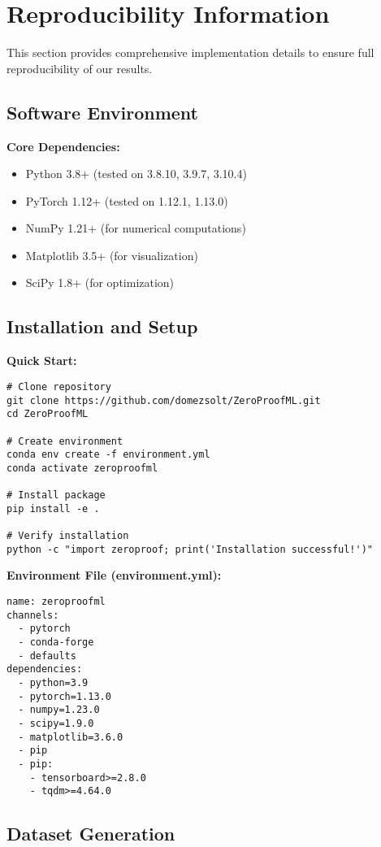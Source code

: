 \documentclass[twoside,11pt]{article}
\begin{document}
\section{Reproducibility Information}
\label{app:reproducibility}

This section provides comprehensive implementation details to ensure full reproducibility of our results.

\subsection{Software Environment}

\textbf{Core Dependencies:}
\begin{itemize}
\item Python 3.8+ (tested on 3.8.10, 3.9.7, 3.10.4)
\item PyTorch 1.12+ (tested on 1.12.1, 1.13.0)
\item NumPy 1.21+ (for numerical computations)
\item Matplotlib 3.5+ (for visualization)
\item SciPy 1.8+ (for optimization)
\end{itemize}

\subsection{Installation and Setup}

\textbf{Quick Start:}
\begin{verbatim}
# Clone repository
git clone https://github.com/domezsolt/ZeroProofML.git
cd ZeroProofML

# Create environment
conda env create -f environment.yml
conda activate zeroproofml

# Install package
pip install -e .

# Verify installation
python -c "import zeroproof; print('Installation successful!')"
\end{verbatim}

\textbf{Environment File (environment.yml):}
\begin{verbatim}
name: zeroproofml
channels:
  - pytorch
  - conda-forge
  - defaults
dependencies:
  - python=3.9
  - pytorch=1.13.0
  - numpy=1.23.0
  - scipy=1.9.0
  - matplotlib=3.6.0
  - pip
  - pip:
    - tensorboard>=2.8.0
    - tqdm>=4.64.0
\end{verbatim}

\subsection{Dataset Generation}
\end{document}
